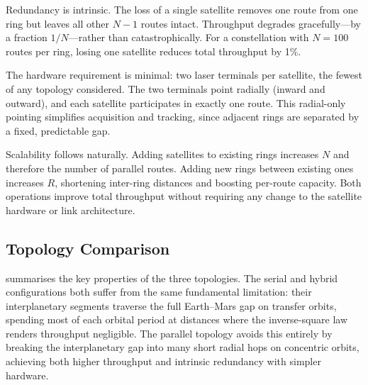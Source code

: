 Redundancy is intrinsic. The loss of a single satellite removes one route from one
ring but leaves all other $N - 1$ routes intact. Throughput degrades gracefully---by
a fraction $1/N$---rather than catastrophically. For a constellation with $N = 100$
routes per ring, losing one satellite reduces total throughput by 1\%.

The hardware requirement is minimal: two laser terminals per satellite, the fewest
of any topology considered. The two terminals point radially (inward and outward),
and each satellite participates in exactly one route. This radial-only pointing
simplifies acquisition and tracking, since adjacent rings are separated by a fixed,
predictable gap.

Scalability follows naturally. Adding satellites to existing rings increases $N$
and therefore the number of parallel routes. Adding new rings between existing
ones increases $R$, shortening inter-ring distances and boosting per-route
capacity. Both operations improve total throughput without requiring any change
to the satellite hardware or link architecture.


\subsection{Topology Comparison}
\label{sec:topo-table}

 summarises the key properties of the three
topologies. The serial and hybrid configurations both suffer from the same
fundamental limitation: their interplanetary segments traverse the full Earth--Mars
gap on transfer orbits, spending most of each orbital period at distances where the
inverse-square law renders throughput negligible. The parallel topology avoids this
entirely by breaking the interplanetary gap into many short radial hops on
concentric orbits, achieving both higher throughput and intrinsic redundancy with simpler
hardware.

